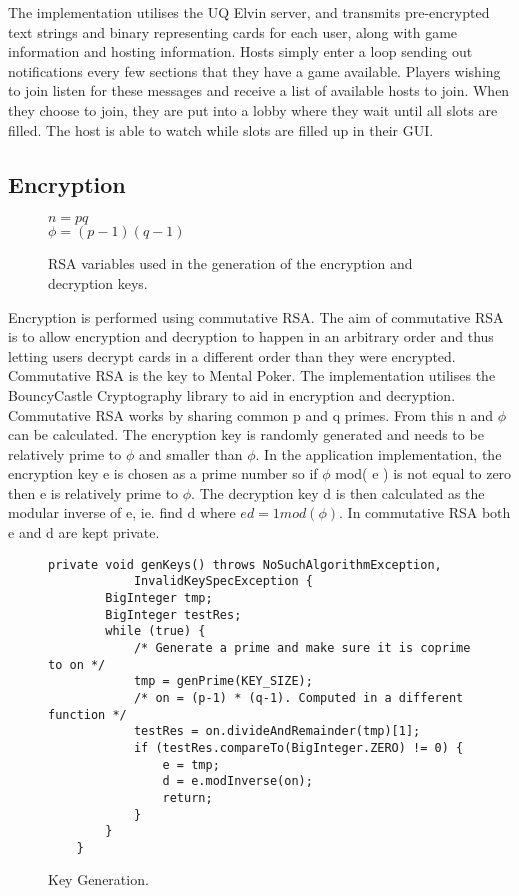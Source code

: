 \documentclass[11pt, oneside]{article}   	%
\begin{document}
The implementation utilises the UQ Elvin server, and transmits pre-encrypted text strings and binary representing cards for each user, along with game information and hosting information. Hosts simply enter a loop sending out notifications every few sections that they have a game available. Players wishing to join listen for these messages and receive a list of available hosts to join. When they choose to join, they are put into a lobby where they wait until all slots are filled. The host is able to watch while slots are filled up in their GUI.

\subsection{Encryption}
\label{sec:encryption}

\begin{figure}[h]
	\caption{RSA variables used in the generation of the encryption and decryption keys.}
  	\centering
	$n=pq$\\$\phi=(p-1)(q-1)$
	\label{fig:rsavars}
\end{figure}

Encryption is performed using commutative RSA. The aim of commutative RSA is to allow encryption and decryption to happen in an arbitrary order and thus letting users decrypt cards in a different order than they were encrypted. Commutative RSA is the key to Mental Poker. The implementation utilises the BouncyCastle Cryptography library to aid in encryption and decryption.\\

Commutative RSA works by sharing common p and q primes. From this n and $\phi$ can be calculated. The encryption key is randomly generated and needs to be relatively prime to $\phi$ and smaller than $\phi$. In the application implementation, the encryption key e is chosen as a prime number so if $\phi$ mod( e ) is not equal to zero then e is relatively prime to $\phi$.  The decryption key d is then calculated as the modular inverse of e, ie. find d where $ed = 1 mod ( \phi)$. In commutative RSA both e and d are kept private.\\

\begin{figure}[h]
\caption{Key Generation.}
\begin{lstlisting}
private void genKeys() throws NoSuchAlgorithmException,
			InvalidKeySpecException {
		BigInteger tmp;
		BigInteger testRes;
		while (true) {
 			/* Generate a prime and make sure it is coprime to on */
			tmp = genPrime(KEY_SIZE);
			/* on = (p-1) * (q-1). Computed in a different function */
			testRes = on.divideAndRemainder(tmp)[1];
			if (testRes.compareTo(BigInteger.ZERO) != 0) {
				e = tmp;
				d = e.modInverse(on);
				return;
			}
		}
	}
\end{lstlisting}
\label{fig:code}
\end{figure}
\end{document}
